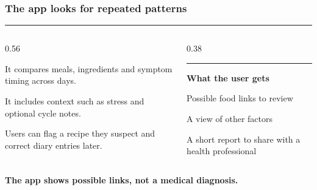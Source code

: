 \documentclass[aspectratio=169,11pt]{beamer}
\newcommand{\frametitleline}[1]{%
  \frametitle{#1}\vspace{-0.25em}\textcolor{coral}{\rule{1.05cm}{2pt}}\par\vspace{0.7em}%
}
\begin{document}
\begin{frame}
  \frametitleline{The app looks for repeated patterns}
  \begin{columns}[T,onlytextwidth]
    \begin{column}{0.56\textwidth}
      {\fontsize{21}{28}\selectfont
        It compares meals, ingredients and symptom timing across days.\par\vspace{0.45cm}
        It includes context such as stress and optional cycle notes.\par\vspace{0.45cm}
        Users can flag a recipe they suspect and correct diary entries later.\par}
    \end{column}
    \begin{column}{0.38\textwidth}
      \vspace{0.12cm}
      {\color{coral}\rule{0.08cm}{3.3cm}}\hspace{0.28cm}%
      \begin{minipage}[t]{0.88\linewidth}
        {\large\bfseries What the user gets}\par\vspace{0.2cm}
        {\large\color{muted}
          Possible food links to review\par\vspace{0.28cm}
          A view of other factors\par\vspace{0.28cm}
          A short report to share with a health professional}
      \end{minipage}
    \end{column}
  \end{columns}
  \vfill
  \textbf{The app shows possible links, not a medical diagnosis.}
\end{frame}
\end{document}
